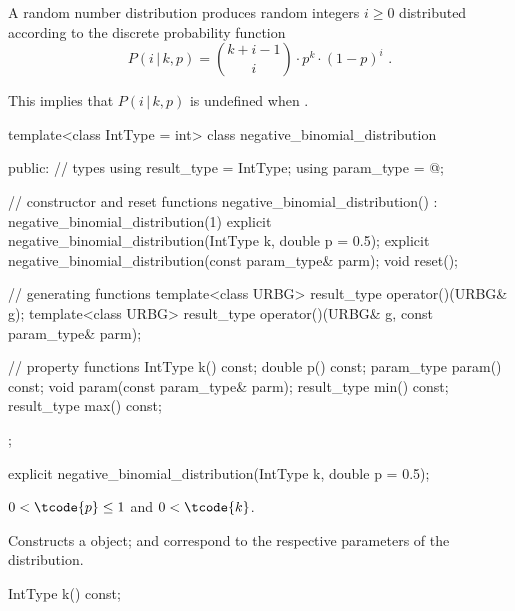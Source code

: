 \pnum
A  random number distribution
produces random integers $i \geq 0$
distributed according to
the discrete probability function
%
%
\[ P(i\,|\,k,p) = \binom{k+i-1}{i} \cdot p^k \cdot (1-p)^i \text{ .} \]
\begin{note}
This implies that $P(i\,|\,k,p)$ is undefined when .
\end{note}

%
\begin{codeblock}
template<class IntType = int>
  class negative_binomial_distribution {
  public:
    // types
    using result_type = IntType;
    using param_type  = @\unspec@;

    // constructor and reset functions
    negative_binomial_distribution() : negative_binomial_distribution(1) {}
    explicit negative_binomial_distribution(IntType k, double p = 0.5);
    explicit negative_binomial_distribution(const param_type& parm);
    void reset();

    // generating functions
    template<class URBG>
      result_type operator()(URBG& g);
    template<class URBG>
      result_type operator()(URBG& g, const param_type& parm);

    // property functions
    IntType k() const;
    double p() const;
    param_type param() const;
    void param(const param_type& parm);
    result_type min() const;
    result_type max() const;
  };
\end{codeblock}


%
\begin{itemdecl}
explicit negative_binomial_distribution(IntType k, double p = 0.5);
\end{itemdecl}

\begin{itemdescr}
\pnum\requires
 $0 < \tcode{p} \leq 1$
 and $0 < \tcode{k} $.

\pnum\effects Constructs a  object;
  and 
 correspond to the respective parameters of the distribution.
\end{itemdescr}

%
\begin{itemdecl}
IntType k() const;
\end{itemdecl}

